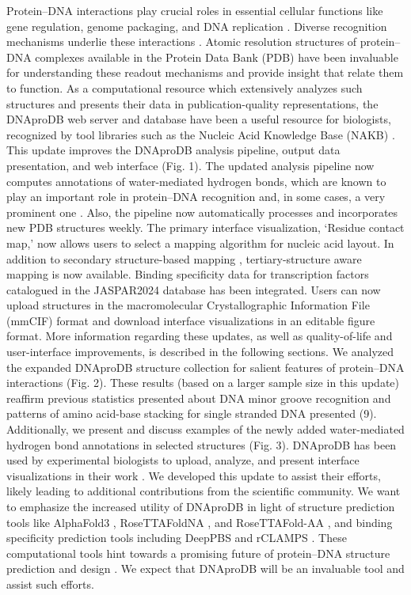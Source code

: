 Protein–DNA interactions play crucial roles in essential cellular functions like gene regulation, genome packaging, and DNA replication \citep{Spitz2012, Lai2017}. Diverse recognition mechanisms underlie these interactions \citep{rohs2009role, Rohs2010, Kitayner2010, Chiu2023}. Atomic resolution structures of protein–DNA complexes available in the Protein Data Bank (PDB) \citep{berman2000protein} have been invaluable for understanding these readout mechanisms and provide insight that relate them to function. As a computational resource which extensively analyzes such structures and presents their data in publication-quality representations, the DNAproDB web server \citep{Sagendorf2017} and database \citep{Sagendorf2020} have been a useful resource for biologists, recognized by tool libraries such as the Nucleic Acid Knowledge Base (NAKB) \citep{Lawson2024}. 
This update improves the DNAproDB analysis pipeline, output data presentation, and web interface (Fig. 1). The updated analysis pipeline now computes annotations of water-mediated hydrogen bonds, which are known to play an important role \citep{Reddy2001} in protein–DNA recognition and, in some cases, a very prominent one \citep{Otwinowski1988}. Also, the pipeline now automatically processes and incorporates new PDB structures weekly. The primary interface visualization, ‘Residue contact map,’ now allows users to select a mapping algorithm for nucleic acid layout. In addition to secondary structure-based mapping \citep{Lorenz2011}, tertiary-structure aware mapping \citep{Mitra2024rnascape} is now available. Binding specificity data for transcription factors catalogued in the JASPAR2024 \citep{Rauluseviciute2024} database has been integrated. Users can now upload structures in the macromolecular Crystallographic Information File (mmCIF) format and download interface visualizations in an editable figure format. More information regarding these updates, as well as quality-of-life and user-interface improvements, is described in the following sections.
We analyzed the expanded DNAproDB structure collection for salient features of protein–DNA interactions (Fig. 2). These results (based on a larger sample size in this update) reaffirm previous statistics presented about DNA minor groove recognition \citep{rohs2009role} and patterns of amino acid-base stacking for single stranded DNA presented (9). Additionally, we present and discuss examples of the newly added water-mediated hydrogen bond annotations in selected structures (Fig. 3).
DNAproDB has been used by experimental biologists to upload, analyze, and present interface visualizations in their work \citep{Webb2024}. We developed this update to assist their efforts, likely leading to additional contributions from the scientific community. We want to emphasize the increased utility of DNAproDB in light of structure prediction tools like AlphaFold3 \citep{Abramson2024}, RoseTTAFoldNA \citep{baek2024na}, and RoseTTAFold-AA \citep{Krishna2024}, and binding specificity prediction tools including DeepPBS \citep{Mitra2024} and rCLAMPS \citep{Wetzel2022}. These computational tools hint towards a promising future of protein–DNA structure prediction and design \citep{Glasscock2023}. We expect that DNAproDB will be an invaluable tool and assist such efforts.

